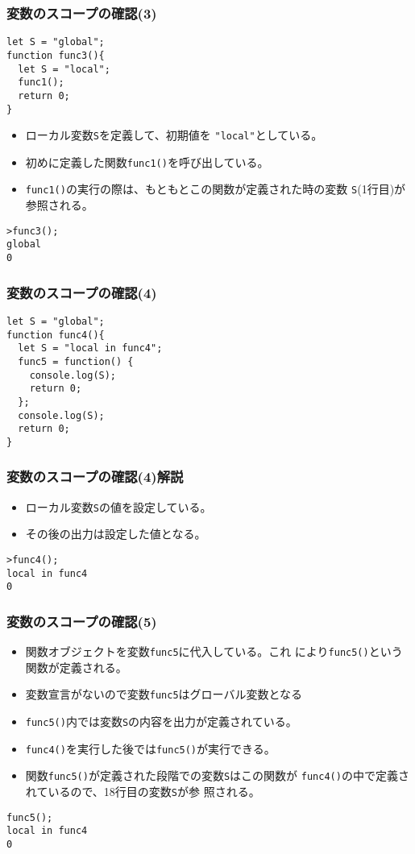 \begin{frame}[containsverbatim]
\frametitle{変数のスコープの確認(3)}
\begin{Verbatim}
let S = "global";
function func3(){
  let S = "local";
  func1();
  return 0;
}
\end{Verbatim}
\begin{itemize}
 \item ローカル変数\Verb+S+を定義して、初期値を
       \Verb+"local"+としている。
 \item 初めに定義した関数\Verb+func1()+を呼び出している。
 \item \Verb+func1()+の実行の際は、もともとこの関数が定義された時の変数
       \Verb+S+(1行目)が参照される。
\end{itemize}
\begin{Verbatim}
>func3();
global
0
\end{Verbatim}
\end{frame}
\begin{frame}[containsverbatim]
\frametitle{変数のスコープの確認(4)}
\begin{Verbatim}
let S = "global";
function func4(){
  let S = "local in func4";
  func5 = function() {
    console.log(S);
    return 0;
  };
  console.log(S);
  return 0;
}
\end{Verbatim}
\end{frame}
\begin{frame}[containsverbatim]
\frametitle{変数のスコープの確認(4)解説}
\begin{itemize}
 \item ローカル変数\Verb+S+の値を設定している。
 \item その後の出力は設定した値となる。
\end{itemize}
\begin{Verbatim}
>func4();
local in func4
0
\end{Verbatim}
\end{frame}
\begin{frame}[containsverbatim]
\frametitle{変数のスコープの確認(5)}
\begin{itemize}
 \item 関数オブジェクトを変数\Verb+func5+に代入している。これ
       により\Verb+func5()+という関数が定義される。
 \item 変数宣言がないので変数\Verb+func5+はグローバル変数となる
  \item \Verb+func5()+内では変数\Verb+S+の内容を出力が定義されている。
 \item \Verb+func4()+を実行した後では\Verb+func5()+が実行できる。
 \item 関数\Verb+func5()+が定義された段階での変数\Verb+S+はこの関数が
       \Verb+func4()+の中で定義されているので、18行目の変数\Verb+S+が参
       照される。
\end{itemize}
\begin{Verbatim}
func5();
local in func4
0
\end{Verbatim}
\end{frame}
